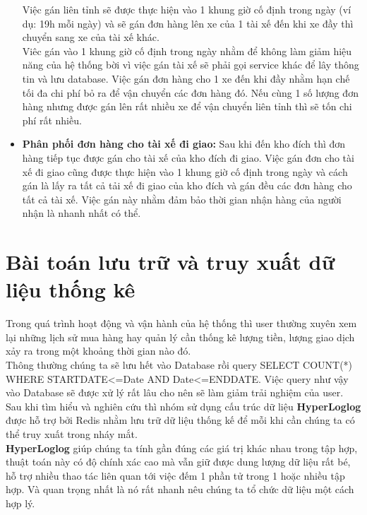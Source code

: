 \begin{itemize}
                Việc gán liên tỉnh sẽ được thực hiện vào 1 khung giờ cố định trong ngày (ví dụ: 19h mỗi ngày) và sẽ gán đơn hàng lên xe của 1 tài xế đến khi xe đầy thì chuyển sang xe của tài xế khác.\\
                
                Viêc gán vào 1 khung giờ cố định trong ngày nhằm để không làm giảm hiệu năng của hệ thống bời vì việc gán tài xế sẽ phải gọi service khác để lây thông tin và lưu database. Việc gán đơn hàng cho 1 xe đến khi đầy nhằm hạn chế tối đa chi phí bỏ ra để vận chuyển các đơn hàng đó. Nếu cùng 1 số lượng đơn hàng nhưng được gán lên rất nhiều xe để vận chuyển liên tỉnh thì sẽ tốn chi phí rất nhiều.
                
                \item \textbf{Phân phối đơn hàng cho tài xế  đi giao:} Sau khi đến kho đích thì đơn hàng tiếp tục được gán cho tài xế của kho đích đi giao. Việc gán đơn cho tài xế đi giao cũng được thực hiện vào 1 khung giờ cố định trong ngày và cách gán là lấy ra tất cả tải xế đi giao của kho đích và gán đều các đơn hàng cho tất cả tài xế. Việc gán này nhằm đảm bảo thời gian nhận hàng của người nhận là nhanh nhất có thể.
                
            \end{itemize}
            
            
            \section{Bài toán lưu trữ và truy xuất dữ liệu thống kê}
                Trong quá trình hoạt động và vận hành của hệ thống thì user thường xuyên xem lại những lịch sử mua hàng hay quản lý cần thống kê lượng tiền, lượng giao dịch xảy ra trong một khoảng thời gian nào đó.\\
                
                Thông thường chúng ta sẽ lưu hết vào Database rồi query SELECT COUNT(*) WHERE STARTDATE<=Date AND Date<=ENDDATE. Việc query như vậy vào Database sẽ được xử lý rất lâu cho nên sẽ làm giảm trải nghiệm của user.\\
                
                Sau khi tìm hiểu và nghiên cứu thì nhóm sử dụng cấu trúc dữ liệu \textbf{HyperLoglog} được hỗ trợ bởi Redis nhằm lưu trữ dữ liệu thống kế để mỗi khi cần chúng ta có thể truy xuất trong nháy mắt.\\
                
                \textbf{HyperLoglog} giúp chúng ta tính gần đúng các giá trị khác nhau trong tập hợp, thuật toán này có độ chính xác cao mà vẫn giữ được dung lượng dữ liệu rất bé, hỗ trợ nhiều thao tác liên quan tới việc đếm 1 phần tử trong 1 hoặc nhiều tập hợp. Và quan trọng nhất là nó rất nhanh nêu chúng ta tổ chức dữ liệu một cách hợp lý.\\
                
